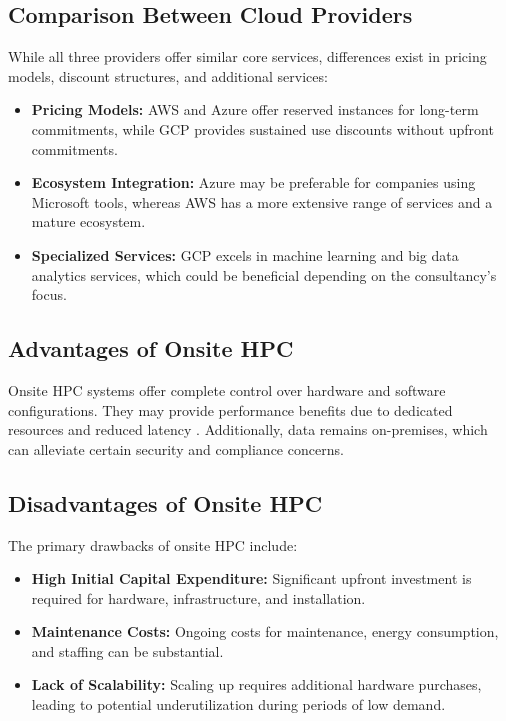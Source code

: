 \documentclass{article}
\begin{document}
\subsection{Comparison Between Cloud Providers}
While all three providers offer similar core services, differences exist in pricing models, discount structures, and additional services:
\begin{itemize}
    \item \textbf{Pricing Models:} AWS and Azure offer reserved instances for long-term commitments, while GCP provides sustained use discounts without upfront commitments.
    \item \textbf{Ecosystem Integration:} Azure may be preferable for companies using Microsoft tools, whereas AWS has a more extensive range of services and a mature ecosystem.
    \item \textbf{Specialized Services:} GCP excels in machine learning and big data analytics services, which could be beneficial depending on the consultancy's focus.
\end{itemize}

\subsection{Advantages of Onsite HPC}
Onsite HPC systems offer complete control over hardware and software configurations. They may provide performance benefits due to dedicated resources and reduced latency \parencite{stergiou2018iot}. Additionally, data remains on-premises, which can alleviate certain security and compliance concerns.

\subsection{Disadvantages of Onsite HPC}

The primary drawbacks of onsite HPC include:

\begin{itemize}
    \item \textbf{High Initial Capital Expenditure:} Significant upfront investment is required for hardware, infrastructure, and installation.
    \item \textbf{Maintenance Costs:} Ongoing costs for maintenance, energy consumption, and staffing can be substantial.
    \item \textbf{Lack of Scalability:} Scaling up requires additional hardware purchases, leading to potential underutilization during periods of low demand.
\end{itemize}
\end{document}
